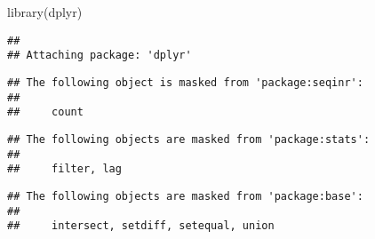 \documentclass[
]{article}
\newenvironment{Shaded}{\begin{snugshade}}{\end{snugshade}}
\newcommand{\FunctionTok}[1]{\textcolor[rgb]{0.00,0.00,0.00}{#1}}
\newcommand{\NormalTok}[1]{#1}
\begin{document}
\begin{Shaded}
\begin{Highlighting}[]
\FunctionTok{library}\NormalTok{(dplyr)}
\end{Highlighting}
\end{Shaded}

\begin{verbatim}
## 
## Attaching package: 'dplyr'
\end{verbatim}

\begin{verbatim}
## The following object is masked from 'package:seqinr':
## 
##     count
\end{verbatim}

\begin{verbatim}
## The following objects are masked from 'package:stats':
## 
##     filter, lag
\end{verbatim}

\begin{verbatim}
## The following objects are masked from 'package:base':
## 
##     intersect, setdiff, setequal, union
\end{verbatim}
\end{document}
